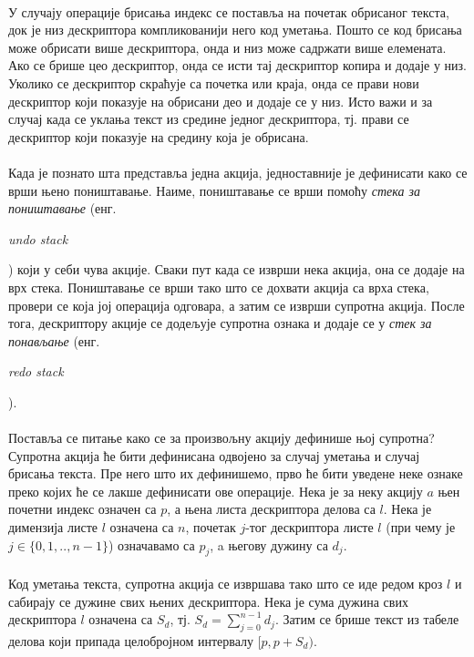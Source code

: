 \documentclass[12pt,oneside]{memoir}
\begin{document}
\paragraph{}
У случају операције брисања индекс се поставља на почетак обрисаног текста, 
док је низ дескриптора компликованији него код уметања. Пошто се код брисања
може обрисати више дескриптора, онда и низ може садржати више елемената. Ако
се брише цео дескриптор, онда се исти тај дескриптор копира и додаје у низ. Уколико се дескриптор скраћује са почетка или краја, онда се прави нови дескриптор који показује на обрисани део и додаје се у низ. Исто важи и за
случај када се уклања текст из средине једног дескриптора, тј. прави се
дескриптор који показује на средину која је обрисана.

\paragraph{}
Када је познато шта представља једна акција, једноставније је дефинисати како 
се врши њено поништавање. Наиме, поништавање се врши помоћу \emph{стека за поништавање} (енг. \begin{latinica}\textit{undo stack}\end{latinica}) 
који у себи чува акције. Сваки пут када се изврши нека акција, она се додаје 
на врх стека. Поништавање се врши тако што се дохвати акција са врха стека, провери се која јој операција одговара, а затим се изврши супротна акција. После тога, дескриптору акције се додељује супротна ознака и додаје се у \emph{стек за понављање}
(енг. \begin{latinica}\textit{redo stack}\end{latinica}).

\paragraph{}
Поставља се питање како се за произвољну акцију дефинише њој супротна? 
Супротна акција ће бити дефинисана одвојено за случај уметања и случај брисања
текста. Пре него што их дефинишемо, прво ће бити уведене неке ознаке преко
којих ће се лакше дефинисати ове операције. Нека је за неку акцију \(a\)
њен почетни индекс означен са \(p\), а њена листа дескриптора делова
са \(l\). Нека је димензија листе \(l\) означена са \(n\), почетак
\(j\)-тог дескриптора листе \(l\) (при чему је \(j \in \{0,1,..,n-1\}\))
означавамо са \(p_j\), a његову дужину са \(d_j\).

\paragraph{}
 Код уметања текста, супротна акција се извршава тако што се иде редом кроз
 \(l\) и сабирају се дужине свих њених
 дескриптора. Нека је сума дужина свих дескриптора \(l\) означена са \(S_d\), тј. \(S_d=\sum_{j=0}^{n-1} d_j\). Затим се брише текст
 из табеле делова који припада целобројном интервалу \([p, p+S_d)\).
\end{document}
